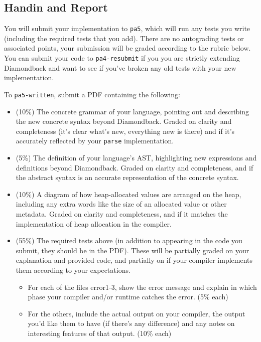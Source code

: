 \documentclass[10pt, oneside]{article}
\begin{document}
\subsection*{Handin and Report}

You will submit your implementation to {\tt pa5}, which will run any tests
you write (including the required tests that you add). There are no
autograding tests or associated points, your submission will be graded
according to the rubric below. You can submit your code to {\tt pa4-resubmit}
if you you are strictly extending Diamondback and want to see if you've
broken any old tests with your new implementation.

To {\tt pa5-written}, submit a PDF containing the following:

\begin{itemize}

\item (10\%) The concrete grammar of your language, pointing out and
describing the new concrete syntax beyond Diamondback. Graded on clarity and
completeness (it's clear what's new, everything new is there) and if it's
accurately reflected by your {\tt parse} implementation.

\item (5\%) The definition of your language's AST, highlighting new
expressions and definitions beyond Diamondback. Graded on clarity and
completeness, and if the abstract syntax is an accurate representation of the
concrete syntax.

\item (10\%) A diagram of how heap-allocated values are arranged on the heap,
including any extra words like the size of an allocated value or other
metadata. Graded on clarity and completeness, and if it matches the
implementation of heap allocation in the compiler.

\item (55\%) The required tests above (in addition to appearing in the code
you submit, they should be in the PDF). These will be partially graded on
your explanation and provided code, and partially on if your compiler
implements them according to your expectations.

  \begin{itemize}

    \item For each of the files error1-3, show the error message and explain
    in which phase your compiler and/or runtime catches the error. (5\% each)

    \item For the others, include the actual output on your compiler, the
    output you'd like them to have (if there's any difference) and any notes
    on interesting features of that output. (10\% each)
  \end{itemize}


\end{itemize}
\end{document}
